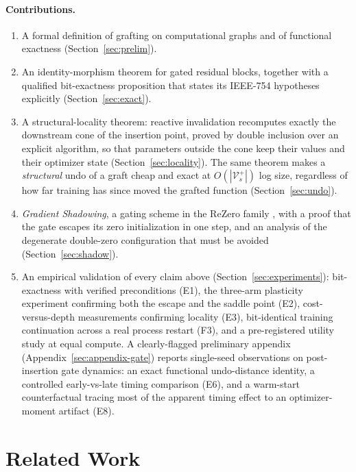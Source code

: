 \documentclass[11pt,a4paper]{article}
\newcommand{\V}{\mathcal{V}}
\begin{document}
\paragraph{Contributions.}
\begin{enumerate}
    \item A formal definition of grafting on computational graphs and of functional exactness (Section~\ref{sec:prelim}).
    \item An identity-morphism theorem for gated residual blocks, together with a qualified bit-exactness proposition that states its IEEE-754 hypotheses explicitly (Section~\ref{sec:exact}).
    \item A structural-locality theorem: reactive invalidation recomputes exactly the downstream cone of the insertion point, proved by double inclusion over an explicit algorithm, so that parameters outside the cone keep their values and their optimizer state (Section~\ref{sec:locality}). The same theorem makes a \emph{structural} undo of a graft cheap and exact at $O(|\V_s^+|)$ log size, regardless of how far training has since moved the grafted function (Section~\ref{sec:undo}).
    \item \emph{Gradient Shadowing}, a gating scheme in the ReZero family \cite{rezero}, with a proof that the gate escapes its zero initialization in one step, and an analysis of the degenerate double-zero configuration that must be avoided (Section~\ref{sec:shadow}).
    \item An empirical validation of every claim above (Section~\ref{sec:experiments}): bit-exactness with verified preconditions (E1), the three-arm plasticity experiment confirming both the escape and the saddle point (E2), cost-versus-depth measurements confirming locality (E3), bit-identical training continuation across a real process restart (F3), and a pre-registered utility study at equal compute. A clearly-flagged preliminary appendix (Appendix~\ref{sec:appendix-gate}) reports single-seed observations on post-insertion gate dynamics: an exact functional undo-distance identity, a controlled early-vs-late timing comparison (E6), and a warm-start counterfactual tracing most of the apparent timing effect to an optimizer-moment artifact (E8).
\end{enumerate}

\section{Related Work}
\label{sec:related}
\end{document}
